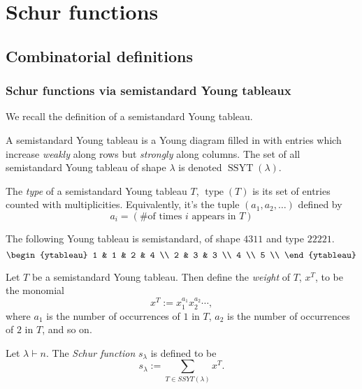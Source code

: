 \documentclass{article}
\DeclareMathOperator{\type}{type}
\DeclareMathOperator{\SSYT}{SSYT}
\begin{document}
\section{Schur functions}\label{ch:schurs}
\subsection{Combinatorial definitions}
\subsubsection{Schur functions via semistandard Young tableaux}

We recall the definition of a semistandard Young tableau.

\begin{definition}
    A semistandard Young tableau is a Young diagram filled in with entries which increase \textit{weakly} along rows but \textit{strongly} along columns. 
    The set of all semistandard Young tableau of shape $\lambda$ is denoted $\SSYT(\lambda)$.

    The \textit{type} of a semistandard Young tableau $T$, $\type(T)$ is its set of entries counted with multiplicities. Equivalently, it's the tuple $(a_1, a_2, \ldots)$ defined by
    \[
        a_i = (\#\text{of times }i\text{ appears in }T)
    \]
\end{definition}

\begin{example}
    The following Young tableau is semistandard, of shape $4311$ and type $22221$.
    \[
        \begin{ytableau}
            1 & 1 & 2 & 4 \\
            2 & 3 & 3  \\
            4 \\
            5 \\ 
        \end{ytableau}
    \]
\end{example}

\begin{definition}
    Let $T$ be a semistandard Young tableau.  Then define the \textit{weight} of $T$, $x^T$, to be the monomial
    \[
        x^T := x_1^{a_1}x_2^{a_2}\cdots,
    \]
    where $a_1$ is the number of occurrences of $1$ in $T$, $a_2$ is the number of occurrences of $2$ in $T$, and so on.
\end{definition}

\begin{definition}
    Let $\lambda \vdash n$. The \textit{Schur function} $s_\lambda$ is defined to be
    \[
        s_\lambda := \sum_{T \in SSYT(\lambda)} x^T.
    \]
\end{definition}
\end{document}
